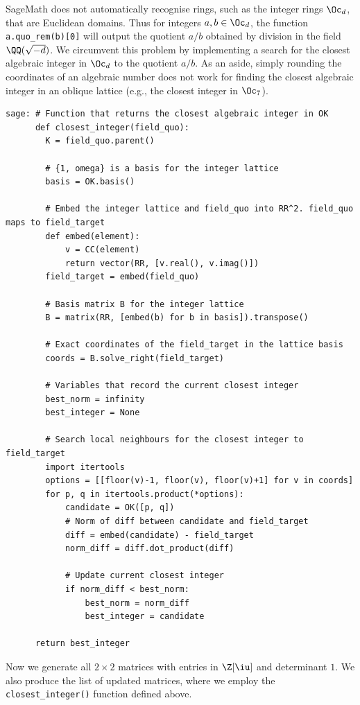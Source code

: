 \documentclass[runningheads]{llncs}
\begin{document}
SageMath does not automatically recognise rings, such as the integer rings \(\Oc_d\), that are Euclidean domains. Thus for integers \(a,b\in\Oc_d\), the function \verb|a.quo_rem(b)[0]| will output the quotient \(a/b\) obtained by division in the field \(\QQ(\sqrt{- d})\). 
We circumvent this problem by implementing a search for the {closest} algebraic integer in \(\Oc_d\) to the quotient \(a/b\).
As an aside, simply rounding the coordinates of an algebraic number does not work for finding the closest algebraic integer in an oblique lattice (e.g., the closest integer in \(\Oc_7\)).
\begin{lstlisting}
sage: # Function that returns the closest algebraic integer in OK
      def closest_integer(field_quo):
        K = field_quo.parent()
    
        # {1, omega} is a basis for the integer lattice
        basis = OK.basis()
    
        # Embed the integer lattice and field_quo into RR^2. field_quo maps to field_target
        def embed(element):
            v = CC(element) 
            return vector(RR, [v.real(), v.imag()])
        field_target = embed(field_quo)
    
        # Basis matrix B for the integer lattice
        B = matrix(RR, [embed(b) for b in basis]).transpose()
    
        # Exact coordinates of the field_target in the lattice basis
        coords = B.solve_right(field_target)
    
        # Variables that record the current closest integer
        best_norm = infinity
        best_integer = None

        # Search local neighbours for the closest integer to field_target
        import itertools
        options = [[floor(v)-1, floor(v), floor(v)+1] for v in coords]
        for p, q in itertools.product(*options):
            candidate = OK([p, q])
            # Norm of diff between candidate and field_target
            diff = embed(candidate) - field_target
            norm_diff = diff.dot_product(diff)

            # Update current closest integer 
            if norm_diff < best_norm:
                best_norm = norm_diff
                best_integer = candidate
            
      return best_integer
\end{lstlisting}

Now we generate all \(2\times 2\) matrices with entries in \(\Z[\iu]\) and determinant \(1\).  We also produce the list of updated matrices, where we employ the \verb|closest_integer()| function defined above.
\end{document}
